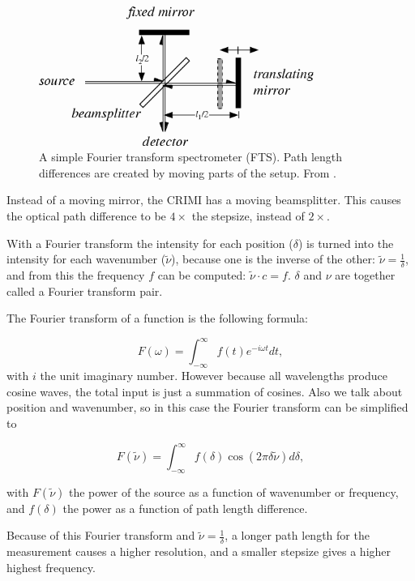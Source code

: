 \begin{figure}
 \begin{center}
  \includegraphics[width=0.8\textwidth]{figures/fts.png}
  \caption{A simple Fourier transform spectrometer (FTS). Path length differences are created by moving parts of the setup.  From \cite{wolf}.}
  \label{fig:fts}
 \end{center}
\end{figure}

Instead of a moving mirror, the CRIMI has a moving beamsplitter. This causes the optical path difference to be $4\times$ the stepsize, instead of $2\times$.

With a Fourier transform the intensity for each position ($\delta$) is turned into the intensity for each wavenumber ($\tilde{\nu}$), because one is the inverse of the other: $\tilde{\nu} = \frac{1}{\delta}$, and from this the frequency $f$ can be computed: $\tilde{\nu}\cdot c=f$. $\delta$ and $\nu$ are together called a Fourier transform pair.

The Fourier transform of a function is the following formula:

\[
 F(\omega)=\int_{-\infty}^{\infty}f(t)e^{-i\omega t}dt,
\]
with $i$ the unit imaginary number. However because all wavelengths produce cosine waves, the total input is just a summation of cosines. Also we talk about position and wavenumber, so in this case the Fourier transform can be simplified to

\[
 F(\tilde{\nu}) = \int_{-\infty}^{\infty}f(\delta)\cos(2\pi\delta\tilde{\nu})d\delta,
\]

with $F(\tilde{\nu})$ the power of the source as a function of wavenumber or frequency, and $f(\delta)$ the power as a function of path length difference.

Because of this Fourier transform and $\tilde{\nu} = \frac{1}{\delta}$, a longer path length for the measurement causes a higher resolution, and a smaller stepsize gives a higher highest frequency.

